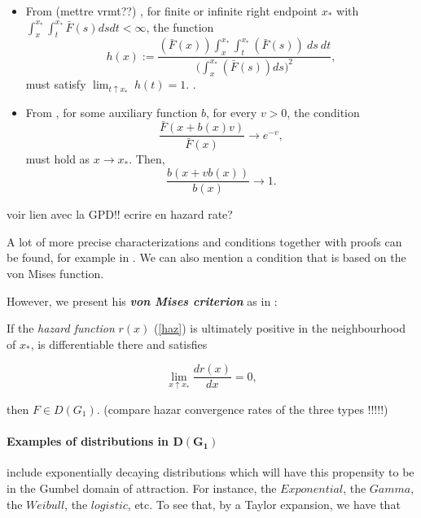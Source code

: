 \documentclass[11pt,a4paper,openany ]{book}
\begin{document}
\begin{itemize}
	\item  From (mettre vrmt??)
	\cite[pp.20]{haan_extreme_2006}, for finite or infinite right endpoint $x_*$ with $\int_x^{x_*}\int_t^{x_*}\bar{F}(s)dsdt<\infty$, the function 
	\begin{equation*}
	h(x):=\frac{(\bar{F}(x))\int_x^{x_*}\int_t^{x_*}(\bar{F}(s))\ ds\ dt}{\bigg(\int_x^{x_*}(\bar{F}(s))ds\bigg)^2},
	\end{equation*}
	must satisfy $\displaystyle{\lim_{t \uparrow x_*}}\ h(t)=1$. . 
	
	\item From \cite[pp.72]{beirlant_statistics_2006},
	for some auxiliary function $b$, for every $v>0$, the condition
	\begin{equation}
	\frac{\bar{F}(x+b(x)v)}{\bar{F}(x)} \to e^{-v},
	\end{equation}
	must hold as $x\to x_*$. Then, 
	\begin{equation*}
	\frac{b(x+vb(x))}{b(x)}\to 1 .
	\end{equation*}
\end{itemize}
voir lien avec la GPD!! ecrire en hazard rate?

A lot of more precise characterizations and conditions together with proofs can be found, for example in \cite[pp.20-33]{haan_extreme_2006}. We can also mention a condition that is based on the von Mises function\cite{}.

However, we present his \emph{\textbf{von Mises criterion}} as in \cite[pp.73]{beirlant_statistics_2006}: 

If the \emph{hazard function} $r(x)$ (\ref{haz})
is ultimately positive in the neighbourhood of $x_*$, is differentiable there and satisfies 

\begin{equation}
\displaystyle{\lim_{x  \uparrow  x_*}} \frac{dr(x)}{dx}=0,
\end{equation}

then $F\in D(G_1)$.
(compare hazar convergence rates of the three types !!!!!)

\paragraph{Examples of distributions in $\boldsymbol{D(G_1)}$} include  exponentially decaying distributions which
will have this propensity to be in the Gumbel domain of attraction. For instance, the $Exponential$, the $Gamma$, the $Weibull$, the $logistic$, etc.
To see that, by a Taylor expansion, we have that 
\end{document}
